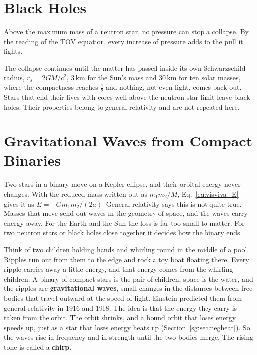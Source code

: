\section{Black Holes}
\label{cs:sec:bh}

Above the maximum mass of a neutron star, no pressure can stop a collapse. By the reading of the TOV equation, every increase of pressure adds to the pull it fights.

The collapse continues until the matter has passed inside its own Schwarzschild radius, $r_s=2GM/c^2$, $3\,\mathrm{km}$ for the Sun's mass and $30\,\mathrm{km}$ for ten solar masses, where the compactness reaches $\tfrac12$ and nothing, not even light, comes back out. Stars that end their lives with cores well above the neutron-star limit leave black holes. Their properties belong to general relativity and are not repeated here.

\section{Gravitational Waves from Compact Binaries}
\label{cs:sec:gw}

Two stars in a binary move on a Kepler ellipse, and their orbital energy never changes. With the reduced mass written out as $m_1m_2/M$, Eq.~\eqref{eq:visviva_E} gives it as $E=-Gm_1m_2/(2a)$. General relativity says this is not quite true. Masses that move send out waves in the geometry of space, and the waves carry energy away. For the Earth and the Sun the loss is far too small to matter. For two neutron stars or black holes close together it decides how the binary ends.

Think of two children holding hands and whirling round in the middle of a pool. Ripples run out from them to the edge and rock a toy boat floating there. Every ripple carries away a little energy, and that energy comes from the whirling children. A binary of compact stars is the pair of children, space is the water, and the ripples are \textbf{gravitational waves}, small changes in the distances between free bodies that travel outward at the speed of light. Einstein predicted them from general relativity in 1916 and 1918. The idea is that the energy they carry is taken from the orbit. The orbit shrinks, and a bound orbit that loses energy speeds up, just as a star that loses energy heats up (Section~\ref{sg:sec:negheat}). So the waves rise in frequency and in strength until the two bodies merge. The rising tone is called a \textbf{chirp}.

